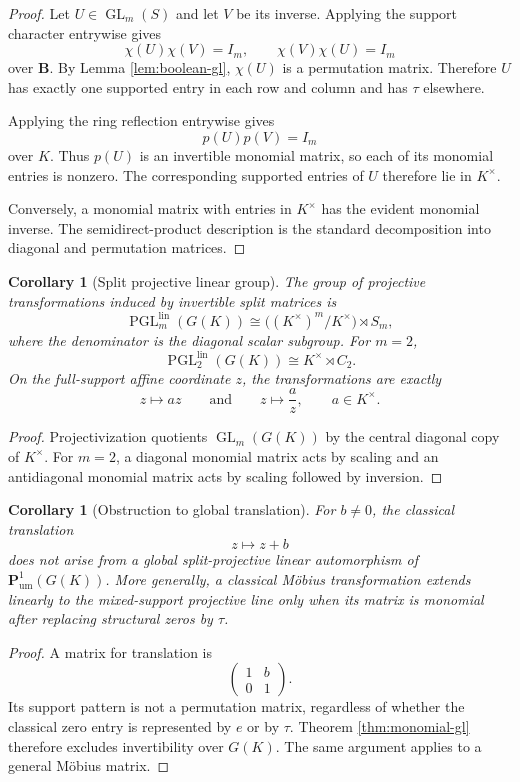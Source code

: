 \documentclass[11pt]{amsart}
\numberwithin{equation}{section}
\newtheorem{corollary}[theorem]{Corollary}
\theoremstyle{definition}
\newcommand{\B}{\mathbf B}
\newcommand{\GL}{\operatorname{GL}}
\newcommand{\Pum}{\mathbf P_{\mathrm{um}}}
\begin{document}
\begin{proof}
Let $U\in\GL_m(S)$ and let $V$ be its inverse.  Applying the support character entrywise gives
\[
\chi(U)\chi(V)=I_m,
\qquad
\chi(V)\chi(U)=I_m
\]
over $\B$.  By Lemma \ref{lem:boolean-gl}, $\chi(U)$ is a permutation matrix.  Therefore $U$ has exactly one supported entry in each row and column and has $\tau$ elsewhere.

Applying the ring reflection entrywise gives
\[
p(U)p(V)=I_m
\]
over $K$.  Thus $p(U)$ is an invertible monomial matrix, so each of its monomial entries is nonzero.  The corresponding supported entries of $U$ therefore lie in $K^\times$.

Conversely, a monomial matrix with entries in $K^\times$ has the evident monomial inverse.  The semidirect-product description is the standard decomposition into diagonal and permutation matrices.
\end{proof}

\begin{corollary}[Split projective linear group]\label{cor:split-pgl}
The group of projective transformations induced by invertible split matrices is
\[
\operatorname{PGL}^{\mathrm{lin}}_m(G(K))
\cong
\bigl((K^\times)^m/K^\times\bigr)\rtimes S_m,
\]
where the denominator is the diagonal scalar subgroup.  For $m=2$,
\[
\operatorname{PGL}^{\mathrm{lin}}_2(G(K))
\cong
K^\times\rtimes C_2.
\]
On the full-support affine coordinate $z$, the transformations are exactly
\[
z\longmapsto az
\qquad\text{and}\qquad
z\longmapsto\frac{a}{z},
\qquad a\in K^\times.
\]
\end{corollary}

\begin{proof}
Projectivization quotients $\GL_m(G(K))$ by the central diagonal copy of $K^\times$.  For $m=2$, a diagonal monomial matrix acts by scaling and an antidiagonal monomial matrix acts by scaling followed by inversion.
\end{proof}

\begin{corollary}[Obstruction to global translation]\label{cor:no-global-translation}
For $b\neq0$, the classical translation
\[
z\longmapsto z+b
\]
does not arise from a global split-projective linear automorphism of $\Pum^1(G(K))$.  More generally, a classical M\"obius transformation extends linearly to the mixed-support projective line only when its matrix is monomial after replacing structural zeros by $\tau$.
\end{corollary}

\begin{proof}
A matrix for translation is
\[
\begin{pmatrix}1&b\\0&1\end{pmatrix}.
\]
Its support pattern is not a permutation matrix, regardless of whether the classical zero entry is represented by $e$ or by $\tau$.  Theorem \ref{thm:monomial-gl} therefore excludes invertibility over $G(K)$.  The same argument applies to a general M\"obius matrix.
\end{proof}
\end{document}
